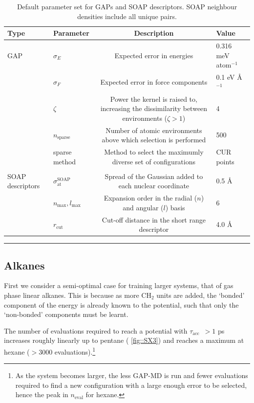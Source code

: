 \documentclass[11pt]{article}
\numberwithin{equation}{subsection}
\newcommand{\tacc}{$\tau_\text{acc}$}
\begin{document}
\begin{table}[h!]
	\def\arraystretch{1.3}
	\begin{tabularx}{\textwidth}{YYCY}
		\hline
		Type&	Parameter	& Description &Value\\
		\hline
			 GAP	   &  $\sigma_E$	&Expected error in energies&        0.316 meV  atom$^{-1}$\\
			               &   $\sigma_F$&	Expected error in force components&  	0.1 eV \AA${}^{-1}$
		\\
		                  & $\zeta$         &Power the kernel is raised to, increasing the dissimilarity between environments ($\zeta > 1$)& 	4
		\\
		                  & $n_\text{sparse}$	     & Number of atomic environments above which  selection is performed &500
		\\
		
		&sparse method	& Method to select the maximumly diverse set of configurations &CUR points\\
		&&&\\
		SOAP descriptors  &$\sigma_\text{at}^\text{SOAP}$& Spread of the Gaussian added to each nuclear coordinate&0.5 \AA
		\\
		                   &$n_\text{max}, l_\text{max}$& Expansion order in the radial ($n$) and angular ($l$) basis &6

		\\
		                   & $r_\text{cut}$ & Cut-off distance in the short range descriptor&   4.0 \AA                    
	\end{tabularx}
	\hrule
	\vspace{0.1cm}
	\caption{Default parameter set for GAPs and SOAP descriptors. SOAP neighbour densities include all unique pairs.}
	\label{table::default_params}
\end{table}

\newpage
\subsection{Alkanes}

First we consider a semi-optimal case for training larger systems, that of gas phase linear alkanes. This is because as more CH${}_2$ units are added, the `bonded' component of the energy is already known to the potential, such that only the `non-bonded' components must be learnt.


The number of evaluations required to reach a potential with \tacc~$>1$ ps increases roughly linearly up to pentane (\figurename{ \ref{fig::SX3}}) and reaches a maximum at hexane ($>3000$ evaluations).\footnote{As the system becomes larger, the less GAP-MD is run and fewer evaluations required to find a new configuration with a large enough error to be selected, hence the peak in $n_\text{eval}$ for hexane.} 
\end{document}
